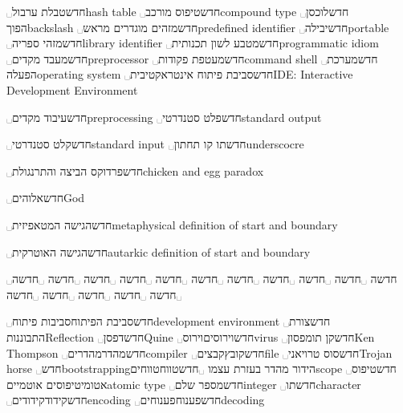 ␣חדש{טבלת ערבול}{hash table}
␣חדש{טיפוס מורכב}{compound type}
␣חדש{לוכסן הפוך}{backslash}
␣חדש{מזהים מוגדרים מראש}{predefined identifier}
␣חדש{יבילה}{portable}
␣חדש{מזהי ספריה}{library identifier}
␣חדש{מטבע לשון תכנותית}{programmatic idiom}
␣חדש{מעבד מקדים}{preprocessor}
␣חדש{מעטפת פקודות}{command shell}
␣חדש{מערכת הפעלה}{operating system}
␣חדש{סביבת פיתוח אינטראקטיבית}{IDE: Interactive Development Environment}


␣חדש{עיבוד מקדים}{preprocessing}
␣חדש{פלט סטנדרטי}{standard output}

␣חדש{קלט סטנדרטי}{standard input}
␣חדש{תו קו תחתון}{underscocre}

␣חדש{פרדוקס הביצה והתרנגולת}{chicken and egg paradox}


␣חדש{אלוהים}{God}


␣חדש{הגישה המטאפיזית}{metaphysical definition of start and boundary}


␣חדש{הגישה האוטרקית}{autarkic definition of start and boundary}



␣חדשה
␣חדשה
␣חדשה
␣חדשה
␣חדשה
␣חדשה
␣חדשה
␣חדשה
␣חדשה
␣חדשה
␣חדשה
␣חדשה
␣חדשה
␣חדשה
␣חדשה
␣חדשה\סי{\unskip~\LR{C}\xspace}

␣חדש{סביבת הפיתוח}{סביבות פיתוח}{development environment}
␣חדש{צורת התבוננות}{Reflection}
␣חדש{דפסן}{Quine}
␣חדש{וירוסים}{וירוס}{virus}
␣חדש{קן תומפסון}{Ken Thompson}
␣חדש{מהדר}{מהדרים}{compiler}
␣חדש{קובץ}{קבצים}{file}
␣חדש{סוס טרויאני}{Trojan horse}
␣חדש{bootstrapping}{הידור מהדר בעזרת עצמו}
␣חדש{טווח}{טווחים}{scope}
␣חדש{טיפוס אטומי}{טיפוסים אוטמיים}{atomic type}
␣חדש{מספר שלם}{integer}
␣חדש{תו}{character}
␣חדש{קידוד}{קידודים}{encoding}
␣חדש{פענוח}{פענוחים}{decoding}
